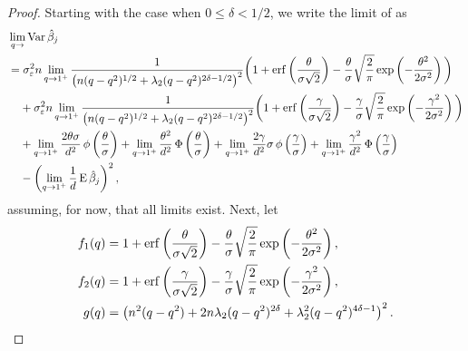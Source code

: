 \begin{proof}
  Starting with the case when \(0 \leq \delta < 1/2\), we write the limit of  as
  \begin{align*}
     & \lim_{q \rightarrow }\var \hat{\beta}_j                                                                                                                                                                                                                                                                                                                                             \\
     & = \sigma_\varepsilon^2 n  \lim_{q \rightarrow 1^+} \frac{1}{\left(n(q-q^2)^{1/2} + \lambda_2(q-q^2)^{2\delta - 1/2}\right)^2}\bigg(1 + \erf\left(\frac{\theta}{\sigma \sqrt{2}}\right) - \frac{\theta}{\sigma}\sqrt{\frac{2}{\pi}} \exp\left(-\frac{\theta^2}{2\sigma^2}\right)\bigg)                                                                                               \\
     & \phantom{= {}} + \sigma_\varepsilon^2 n  \lim_{q \rightarrow 1^+} \frac{1}{\left(n(q-q^2)^{1/2} + \lambda_2(q-q^2)^{2\delta - 1/2}\right)^2}\bigg(1 + \erf\left(\frac{\gamma}{\sigma\sqrt{2}}\right) - \frac{\gamma}{\sigma} \sqrt{\frac{2}{\pi}} \exp\left(- \frac{\gamma^2}{2\sigma^2}\right)\bigg)                                                                               \\
     & \phantom{= {}}+ \lim_{q \rightarrow 1^+} \frac{2\theta\sigma}{d^2} \pdf\left(\frac{\theta}{\sigma}\right) + \lim_{q \rightarrow 1^+} \frac{\theta^2}{d^2} \cdf\left(\frac{\theta}{\sigma}\right) + \lim_{q \rightarrow 1^+} \frac{2\gamma}{d^2} \sigma \pdf\left(\frac{\gamma}{\sigma}\right) + \lim_{q \rightarrow 1^+}\frac{\gamma^2}{d^2} \cdf\left(\frac{\gamma}{\sigma}\right) \\
     & \phantom{= {}}- \left( \lim_{q\rightarrow 1^+}\frac{1}{d}\E \hat{\beta}_j\right)^2,
  \end{align*}
  assuming, for now, that all limits exist. Next, let
  \[
    \begin{aligned}
      f_1(q) & = 1 + \erf\left(\frac{\theta}{\sigma\sqrt{2}}\right) - \frac{\theta}{\sigma}\sqrt{\frac{2}{\pi}} \exp\left(-\frac{\theta^2}{2\sigma^2}\right) , \\
      f_2(q) & = 1 + \erf\left(\frac{\gamma}{\sigma\sqrt{2}}\right) - \frac{\gamma}{\sigma}\sqrt{\frac{2}{\pi}} \exp\left(-\frac{\gamma^2}{2\sigma^2}\right) , \\
      g(q)   & = \left(n^2(q-q^2) + 2n \lambda_2 (q-q^2)^{2\delta} + \lambda_2^2 (q-q^2)^{4\delta - 1}\right)^2.

\end{aligned}\]
\end{proof}
